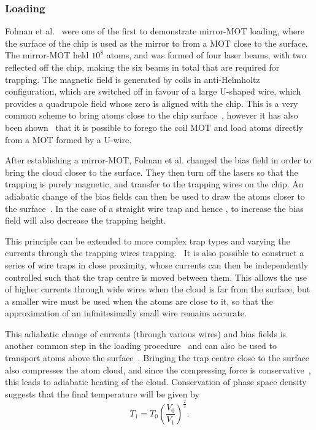 \subsubsection{Loading}

Folman et al.~\cite{Folman2000} were one of the first to demonstrate mirror-MOT
loading, where the surface of the chip is used as the mirror to from a MOT close
to the surface. The mirror-MOT held $10^8$  atoms, and was formed of
four laser beams, with two reflected off the chip, making the six beams in total
that are required for trapping. The magnetic field is generated by coils in
anti-Helmholtz configuration, which are switched off in favour of a large
U-shaped wire, which provides a quadrupole field whose zero is aligned with the
chip. This is a very common scheme to bring atoms close to the chip
surface~\cite{Reichel1999, PhysRevLett.97.200405, 2011Ac, Boehi2009}, however it
has also been shown~\cite{0256-307X-25-9-034} that it is possible to forego the
coil MOT and load atoms directly from a MOT formed by a U-wire.

After establishing a mirror-MOT, Folman et al. changed the bias field in order
to bring the cloud closer to the surface. They then turn off the lasers so that
the trapping is purely magnetic, and transfer to the trapping
wires on the chip. An adiabatic change of the bias fields can then be used to
draw the atoms closer to the surface~\cite{Reichel1999}. In the case of a
straight wire trap and hence , to increase the bias field will
also decrease the trapping height.

This principle can be extended to more complex trap types and varying the
currents through the trapping wires trapping.~\cite{Folman2000} It is also
possible to construct a series of wire traps in close proximity, whose currents
can then be independently controlled such that the trap centre is moved between
them. This allows the use of higher currents through wide wires when the cloud
is far from the surface, but a smaller wire must be used when the atoms are
close to it, so that the approximation of an infinitesimally small wire remains
accurate.

This adiabatic change of currents (through various wires) and bias fields is
another common step in the loading procedure~\cite{Folman2000,2011Ac,
RevModPhys.79.235} and can also be used to transport atoms above the
surface~\cite{Reichel1999, Schwindt2005}. Bringing the trap centre close to the
surface also compresses the atom cloud, and since the compressing force is
conservative~, this leads to adiabatic heating of the cloud.
Conservation of phase space density suggests that the final temperature will be
given by~\cite{Metcalf1999}
%
\begin{equation}
   T_1 = T_0\left(\frac{V_0}{V_1}\right)^\frac{2}{3}.
\end{equation}

